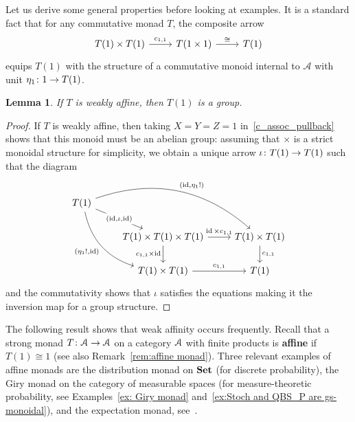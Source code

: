 \documentclass[a4paper,UKenglish,numberwithinsect,cleveref, autoref, thm-restate]{lipics-v2021}
\theoremstyle{plain} %
\newtheorem{mylemma}[mytheorem]{Lemma}
\theoremstyle{definition} %
\begin{document}
Let us derive some general properties before looking at examples.
It is a standard fact that for any commutative monad $T$, the composite arrow
\[
	\begin{tikzcd}
		T(1) \times T(1) \ar{r}{c_{1,1}}	& T(1 \times 1) \ar{r}{\cong}	& T(1)		
	\end{tikzcd}
\]
equips $T(1)$ with the structure of a commutative monoid internal to $\mathcal{A}$ with unit $\freccia{1}{\eta_1}{T(1)}$.

\begin{mylemma}
	\label{lem:T1_group}
	If $T$ is weakly affine, then $T(1)$ is a group.
\end{mylemma}


\begin{proof}
	If $T$ is weakly affine, then taking $X = Y = Z = 1$ in~\eqref{c_assoc_pullback} shows that this monoid must be an abelian group:
	assuming that $\times$ is a strict monoidal structure for simplicity, we obtain a unique arrow $\freccia{T(1)}{\iota}{T(1)}$ such that the diagram
	\[
		\begin{tikzcd}
			T(1) \ar{dr}[description]{(\id,\iota,\id)} \ar[bend left]{drr}{(\id,\eta_1 !)} \ar[bend right,swap]{ddr}{(\eta_1 !,\id)} \\
			&	T(1) \times T(1) \times T(1) \ar{r}{\id \times c_{1,1}} \ar[swap]{d}{c_{1,1} \times \id}	& T(1) \times T(1) \ar{d}{c_{1,1}}	\\
			&	T(1) \times T(1) \ar{r}{c_{1,1}}								& T(1)
		\end{tikzcd}
	\]
	and the commutativity shows that $\iota$ satisfies the equations making it the inversion map for a group structure.
\end{proof}

The following result shows that weak affinity occurs frequently. 
Recall that a strong monad $\freccia{\mA}{T}{\mA}$ on a category $\mA$ with finite products is \textbf{affine} if $T(1)\cong 1$ (see also Remark~\ref{rem:affine monad}). Three relevant examples of affine monads are the distribution monad on $\Set$ (for discrete probability), the Giry monad on the category of measurable spaces (for measure-theoretic probability, see Examples~\ref{ex: Giry monad} and~\ref{ex:Stoch and QBS_P are gs-monoidal}), and the expectation monad, see~\cite{Jacobs16}.
\end{document}
